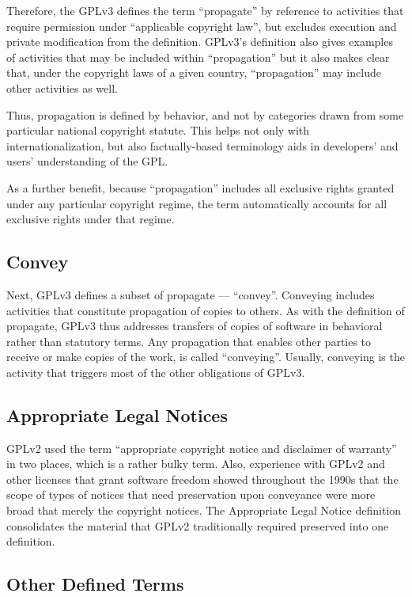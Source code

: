 Therefore, the GPLv3 defines the term ``propagate'' by reference to activities
that require permission under ``applicable copyright law'', but excludes
execution and private modification from the definition.  GPLv3's definition
also gives examples of activities that may be included within ``propagation''
but it also makes clear that, under the copyright laws of a given country,
``propagation'' may include other activities as well.

Thus, propagation is defined by behavior, and not by categories drawn from
some particular national copyright statute.  This helps not only with
internationalization, but also factually-based terminology aids in
developers' and users' understanding of the GPL\@.

As a further benefit, because ``propagation'' includes all
exclusive rights granted under any particular copyright regime, the term
automatically  accounts for all exclusive rights under that regime.

\subsection{Convey}

Next, GPLv3 defines a subset of propagate --- ``convey''.
Conveying includes activities that constitute propagation of copies to
others.  As with the definition of propagate, GPLv3 thus addresses transfers
of copies of software in behavioral rather than statutory terms.  
Any propagation that enables other parties to receive or make copies of the
work, is called ``conveying''.  Usually, conveying is the activity that
triggers most of the other obligations of GPLv3.

\subsection{Appropriate Legal Notices}

GPLv2 used the term ``appropriate copyright notice and disclaimer of
warranty'' in two places, which is a rather bulky term.  Also, experience with
GPLv2 and other licenses that grant software freedom showed throughout the
1990s that the scope of types of notices that need preservation upon
conveyance were more broad that merely the copyright notices.  The
Appropriate Legal Notice definition consolidates the material that GPLv2
traditionally required preserved into one definition.

\subsection{Other Defined Terms}

